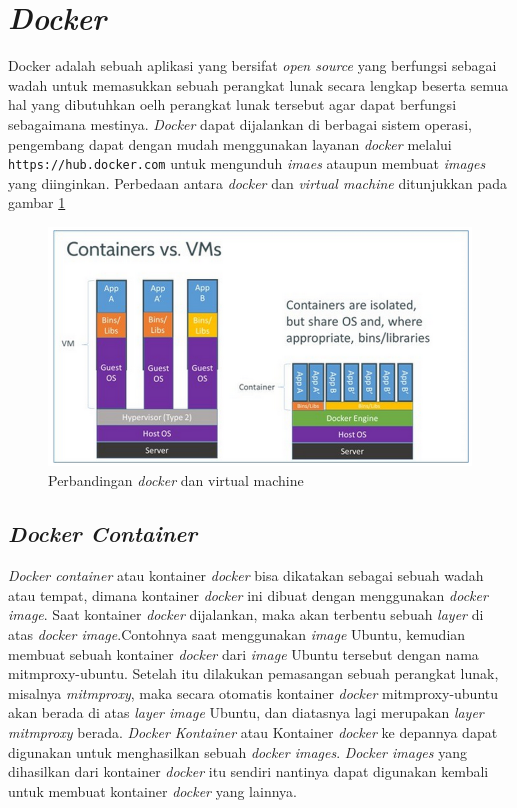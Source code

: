 	\section{\textit{Docker}}
	Docker adalah sebuah aplikasi yang bersifat \textit{open source} yang berfungsi sebagai wadah untuk memasukkan sebuah perangkat lunak secara lengkap beserta semua hal yang dibutuhkan oelh perangkat lunak tersebut agar dapat berfungsi sebagaimana mestinya. \textit{Docker} dapat dijalankan di berbagai sistem operasi, pengembang dapat dengan mudah menggunakan layanan \textit{docker} melalui \texttt{https://hub.docker.com} untuk mengunduh \textit{imaes} ataupun membuat \textit{images} yang diinginkan. Perbedaan antara \textit{docker} dan \textit{virtual machine} ditunjukkan pada gambar \ref{contohDocker}
	
	\begin{figure}[H] %
	\centering
	\includegraphics[width=\linewidth]{images/bab2/docker-vm-container}
	\caption{Perbandingan \textit{docker} dan virtual machine}
	\label{contohDocker}
	\end{figure}
	
	\subsection{\textit{Docker Container}}
	\textit{Docker container} atau kontainer \textit{docker} bisa dikatakan sebagai sebuah wadah atau tempat, dimana kontainer \textit{docker} ini dibuat dengan menggunakan \textit{docker image}. Saat kontainer \textit{docker} dijalankan, maka akan terbentu sebuah \textit{layer} di atas \textit{docker image}.Contohnya saat menggunakan \textit{image} Ubuntu, kemudian membuat sebuah kontainer \textit{docker} dari \textit{image} Ubuntu tersebut dengan nama mitmproxy-ubuntu. Setelah itu dilakukan pemasangan sebuah perangkat lunak, misalnya \textit{mitmproxy}, maka secara otomatis kontainer \textit{docker} mitmproxy-ubuntu akan berada di atas \textit{layer image} Ubuntu, dan diatasnya lagi merupakan \textit{layer mitmproxy} berada. \textit{Docker Kontainer} atau Kontainer \textit{docker} ke depannya dapat digunakan untuk menghasilkan sebuah \textit{docker images}. \textit{Docker images} yang dihasilkan dari kontainer \textit{docker} itu sendiri nantinya dapat digunakan kembali untuk membuat kontainer \textit{docker} yang lainnya.
	
